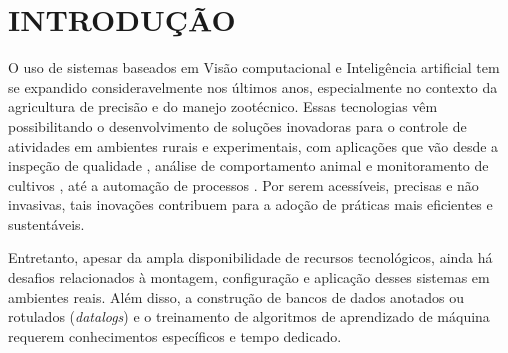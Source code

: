 \documentclass[12pt,fleqn]{article}
\renewcommand{\headrulewidth}{0pt}
\begin{document}



\renewcommand{\headrulewidth}{0pt}


\rhead{}

\pagestyle{fancy}


\section{INTRODUÇÃO}

O uso de sistemas baseados em Visão computacional e Inteligência artificial tem se expandido consideravelmente nos últimos anos, especialmente no contexto da agricultura de precisão e do manejo zootécnico. Essas tecnologias vêm possibilitando o desenvolvimento de soluções inovadoras para o controle de atividades em ambientes rurais e experimentais, com aplicações que vão desde a inspeção de qualidade \citep{industrial_quality_cv_2024}, análise de comportamento animal \cite{animalformer_2024} e monitoramento de cultivos \cite{vit_precision_agriculture_2025}, até a automação de processos \cite{kang2025bokchoy_cv_iot}. Por serem acessíveis, precisas e não invasivas, tais inovações contribuem para a adoção de práticas mais eficientes e sustentáveis.


Entretanto, apesar da ampla disponibilidade de recursos tecnológicos, ainda há desafios relacionados à montagem, configuração e aplicação desses sistemas em ambientes reais. Além disso, a construção de bancos de dados anotados ou rotulados (\textit{datalogs}) e o treinamento de algoritmos de aprendizado de máquina requerem conhecimentos específicos e tempo dedicado.
\end{document}

